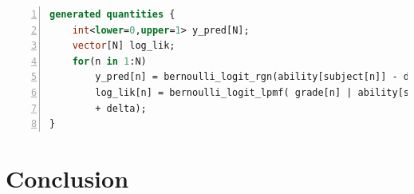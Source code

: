 \begin{lstlisting}[language=Stan,basicstyle=\scriptsize, frame=l,framesep=4.5mm,framexleftmargin=2.5mm,tabsize=2,numbers=left,fillcolor=\color{blueforest!70},rulecolor=\color{blueforest},numberstyle=\normalfont\tiny\color{white}]
generated quantities {
	int<lower=0,upper=1> y_pred[N];
	vector[N] log_lik;
	for(n in 1:N)
		y_pred[n] = bernoulli_logit_rgn(ability[subject[n]] - difficulty[item[n]] + delta);
		log_lik[n] = bernoulli_logit_lpmf( grade[n] | ability[subject[n]] - difficulty[item[n]]
		+ delta);
}
\end{lstlisting}
\section{Conclusion}

